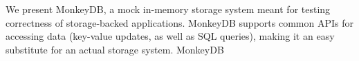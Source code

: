 %
%
%
We present MonkeyDB, a mock in-memory storage system meant for testing
correctness of storage-backed applications. 
MonkeyDB supports 
common APIs for accessing data (key-value updates, as well as SQL queries),
making it an easy substitute for an actual storage system. MonkeyDB
